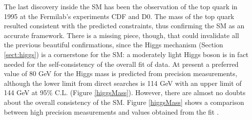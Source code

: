 The last discovery inside the SM has been the observation of the top quark in 1995 at the Fermilab's experiments CDF and D0. The mass of the top quark resulted consistent with the predicted constraints, thus confirming the SM as an accurate framework. There is a missing piece, though, that could invalidate all the previous beautiful confirmations, since the Higgs mechanism (Section \ref{sect:higgs}) is a cornerstone for the SM: a moderately light Higgs boson is in fact needed for the self-consistency of the overall fit of data. At present a preferred value of 80 GeV for the Higgs mass is predicted from precision measurements, although the lower limit from direct searches is 114 GeV with an upper limit of 144 GeV at 95\% C.L. \cite{Renton} (Figure \ref{higgsMass}). However, there are almost no doubts about the overall consistency of the SM. Figure \ref{higgsMass} shows a comparison between high precision measurements and values obtained from the fit \cite{Renton}.



